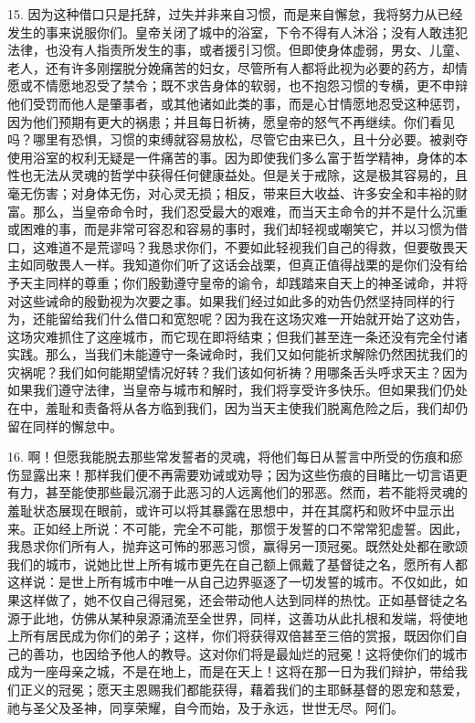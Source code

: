 15. 因为这种借口只是托辞，过失并非来自习惯，而是来自懈怠，我将努力从已经发生的事来说服你们。皇帝关闭了城中的浴室，下令不得有人沐浴；没有人敢违犯法律，也没有人指责所发生的事，或者援引习惯。但即使身体虚弱，男女、儿童、老人，还有许多刚摆脱分娩痛苦的妇女，尽管所有人都将此视为必要的药方，却情愿或不情愿地忍受了禁令；既不求告身体的软弱，也不抱怨习惯的专横，更不申辩他们受罚而他人是肇事者，或其他诸如此类的事，而是心甘情愿地忍受这种惩罚，因为他们预期有更大的祸患；并且每日祈祷，愿皇帝的怒气不再继续。你们看见吗？哪里有恐惧，习惯的束缚就容易放松，尽管它由来已久，且十分必要。被剥夺使用浴室的权利无疑是一件痛苦的事。因为即使我们多么富于哲学精神，身体的本性也无法从灵魂的哲学中获得任何健康益处。但是关于戒除，这是极其容易的，且毫无伤害；对身体无伤，对心灵无损；相反，带来巨大收益、许多安全和丰裕的财富。那么，当皇帝命令时，我们忍受最大的艰难，而当天主命令的并不是什么沉重或困难的事，而是非常可容忍和容易的事时，我们却轻视或嘲笑它，并以习惯为借口，这难道不是荒谬吗？我恳求你们，不要如此轻视我们自己的得救，但要敬畏天主如同敬畏人一样。我知道你们听了这话会战栗，但真正值得战栗的是你们没有给予天主同样的尊重；你们殷勤遵守皇帝的谕令，却践踏来自天上的神圣诫命，并将对这些诫命的殷勤视为次要之事。如果我们经过如此多的劝告仍然坚持同样的行为，还能留给我们什么借口和宽恕呢？因为我在这场灾难一开始就开始了这劝告，这场灾难抓住了这座城市，而它现在即将结束；但我们甚至连一条还没有完全付诸实践。那么，当我们未能遵守一条诫命时，我们又如何能祈求解除仍然困扰我们的灾祸呢？我们如何能期望情况好转？我们该如何祈祷？用哪条舌头呼求天主？因为如果我们遵守法律，当皇帝与城市和解时，我们将享受许多快乐。但如果我们仍处在中，羞耻和责备将从各方临到我们，因为当天主使我们脱离危险之后，我们却仍留在同样的懈怠中。\par

16. 啊！但愿我能脱去那些常发誓者的灵魂，将他们每日从誓言中所受的伤痕和瘀伤显露出来！那样我们便不再需要劝诫或劝导；因为这些伤痕的目睹比一切言语更有力，甚至能使那些最沉溺于此恶习的人远离他们的邪恶。然而，若不能将灵魂的羞耻状态展现在眼前，或许可以将其暴露在思想中，并在其腐朽和败坏中显示出来。正如经上所说：不可能，完全不可能，那惯于发誓的口不常常犯虚誓。因此，我恳求你们所有人，抛弃这可怖的邪恶习惯，赢得另一顶冠冕。既然处处都在歌颂我们的城市，说她比世上所有城市更先在自己额上佩戴了基督徒之名，愿所有人都这样说：是世上所有城市中唯一从自己边界驱逐了一切发誓的城市。不仅如此，如果这样做了，她不仅自己得冠冕，还会带动他人达到同样的热忱。正如基督徒之名源于此地，仿佛从某种泉源涌流至全世界，同样，这善功从此扎根和发端，将使地上所有居民成为你们的弟子；这样，你们将获得双倍甚至三倍的赏报，既因你们自己的善功，也因给予他人的教导。这对你们将是最灿烂的冠冕！这将使你们的城市成为一座母亲之城，不是在地上，而是在天上！这将在那一日为我们辩护，带给我们正义的冠冕；愿天主恩赐我们都能获得，藉着我们的主耶稣基督的恩宠和慈爱，祂与圣父及圣神，同享荣耀，自今而始，及于永远，世世无尽。阿们。\par

